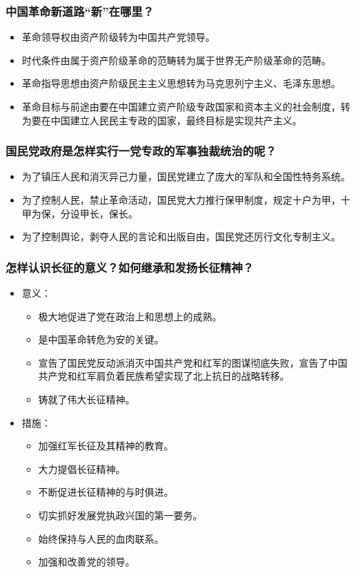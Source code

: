 \documentclass{article}
\begin{document}
\subsubsection{中国革命新道路“新”在哪里？}
\begin{itemize}
    \item 革命领导权由资产阶级转为中国共产党领导。
    \item 时代条件由属于资产阶级革命的范畴转为属于世界无产阶级革命的范畴。
    \item 革命指导思想由资产阶级民主主义思想转为马克思列宁主义、毛泽东思想。
    \item 革命目标与前途由要在中国建立资产阶级专政国家和资本主义的社会制度，转为要在中国建立人民民主专政的国家，最终目标是实现共产主义。
\end{itemize}
    
\subsubsection{国民党政府是怎样实行一党专政的军事独裁统治的呢？}
\begin{itemize}
    \item 为了镇压人民和消灭异己力量，国民党建立了庞大的军队和全国性特务系统。
    \item 为了控制人民，禁止革命活动，国民党大力推行保甲制度，规定十户为甲，十甲为保，分设甲长，保长。
    \item 为了控制舆论，剥夺人民的言论和出版自由，国民党还厉行文化专制主义。
\end{itemize}

\subsubsection{怎样认识长征的意义？如何继承和发扬长征精神？}
\begin{itemize}
    \item 意义：
    \begin{itemize}
        \item 极大地促进了党在政治上和思想上的成熟。
        \item 是中国革命转危为安的关键。
        \item 宣告了国民党反动派消灭中国共产党和红军的图谋彻底失败，宣告了中国共产党和红军肩负着民族希望实现了北上抗日的战略转移。
        \item 铸就了伟大长征精神。
    \end{itemize}
    \item 措施：
    \begin{itemize}
        \item 加强红军长征及其精神的教育。
        \item 大力提倡长征精神。
        \item 不断促进长征精神的与时俱进。
        \item 切实抓好发展党执政兴国的第一要务。
        \item 始终保持与人民的血肉联系。
        \item 加强和改善党的领导。
    \end{itemize}
\end{itemize}
    
\end{document}
